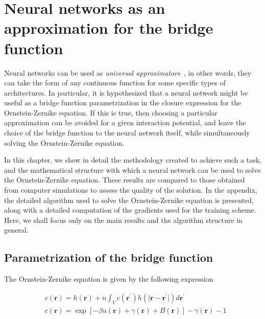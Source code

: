 \newcommand{\vecr}{\mathbf{r}}
\newcommand{\veck}{\mathbf{k}}
\newcommand{\nnet}{N_{\theta}(\mathbf{r})}
\chapter{Neural networks as an approximation for the bridge function} %

\label{Cap3} %


Neural networks can be used as \emph{universal approximators}~\cite{hornikMultilayerFeedforwardNetworks1989, hornikApproximationCapabilitiesMultilayer1991, cybenkoApproximationSuperpositionsSigmoidal1989},
in other words, they can take the form of any continuous function for some specific
types of architectures.
In particular, it is hypothesized that a neural network might be useful as a bridge function
parametrization in the closure expression for the Ornstein-Zernike equation. If this is true,
then choosing a particular approximation can be avoided for a given interaction potential, 
and leave the choice of the bridge function to the neural network itself, while
simultaneously solving the Ornstein-Zernike equation.

In this chapter, we show in detail the methodology created to achieve such a task, and
the mathematical structure with which a neural network can be used to solve the
Ornstein-Zernike equation.
These results are compared to those obtained from computer simulations to assess the
quality of the solution.
In the appendix, the detailed algorithm used to solve the Ornstein-Zernike equation
is presented, along with a detailed computation of the gradients used for the
training scheme. Here, we shall focus only on the main results and the algorithm structure
in general.

\section{Parametrization of the bridge function}

The Ornstein-Zernike equation is given by the following expression

\begin{subequations}
    \begin{align*}
         & c(\vecr) = h(\vecr) +
        n \int_{V}
        c(\vecr^{\prime})
        h(\lvert \vecr - \vecr^{\prime} \rvert)
        d\vecr^{\prime} \label{eq:oz1} \\
         & c(\vecr)
        = \exp{\left[
                -  \beta u(\vecr)
                +  \gamma(\vecr)
                + B(\vecr)
                \right]} -
        \gamma(\vecr)
        - 1
    \end{align*}
\end{subequations}

